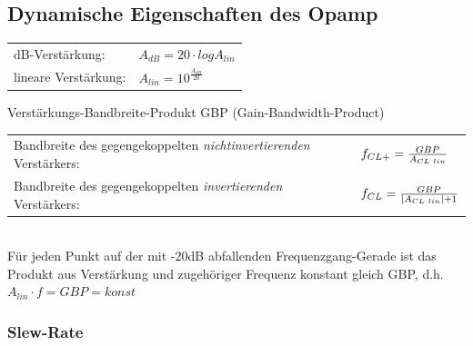 	\subsection{Dynamische Eigenschaften des Opamp}
		\begin{tabular}{ll}
			dB-Verstärkung:&
			$A_{dB}=20 \cdot log A_{lin}$\\
			lineare Verstärkung:&
			$A_{lin}=10^{\frac{A_{dB}}{20}}$\\
		\end{tabular}
		Verstärkungs-Bandbreite-Produkt GBP (Gain-Bandwidth-Product)\\
		\begin{tabular}{ll}
			Bandbreite des gegengekoppelten {\it nichtinvertierenden} Verstärkers:&
			$f_{CL+}=\frac{GBP}{A_{CL \hspace{1mm}lin}}$\\
			Bandbreite des gegengekoppelten {\it invertierenden} Verstärkers: &
			$f_{CL}=\frac{GBP}{\left| A_{CL \hspace{1mm}lin}\right|+1}$\\
		\end{tabular}\\
		Für jeden Punkt auf der mit -20dB abfallenden Frequenzgang-Gerade ist das
		Produkt aus Verstärkung und zugehöriger Frequenz konstant gleich GBP, d.h. $A_{lin}\cdot f=GBP=konst$\\
		\subsubsection{Slew-Rate}
			
